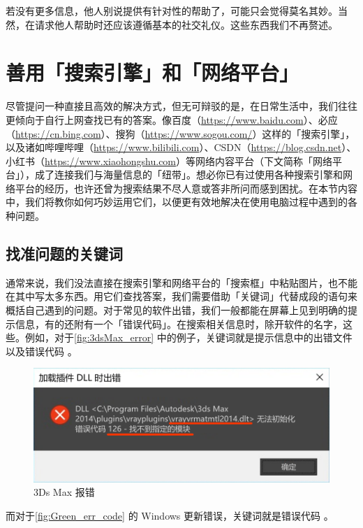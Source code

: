 若没有更多信息，他人别说提供有针对性的帮助了，可能只会觉得莫名其妙。当然，在请求他人帮助时还应该遵循基本的社交礼仪。这些东西我们不再赘述。

\section{善用「搜索引擎」和「网络平台」}

尽管提问一种直接且高效的解决方式，但无可辩驳的是，在日常生活中，我们往往更倾向于自行上网查找已有的答案。像百度（\url{https://www.baidu.com}）、必应（\url{https://cn.bing.com}）、搜狗（\url{https://www.sogou.com/}）这样的「搜索引擎」，以及诸如哔哩哔哩（\url{https://www.bilibili.com}）、CSDN（\url{https://blog.csdn.net}）、小红书（\url{https://www.xiaohongshu.com}）等网络内容平台（下文简称「网络平台」），成了连接我们与海量信息的「纽带」。想必你已有过使用各种搜索引擎和网络平台的经历，也许还曾为搜索结果不尽人意或答非所问而感到困扰。在本节内容中，我们将教你如何巧妙运用它们，以便更有效地解决在使用电脑过程中遇到的各种问题。

\subsection{找准问题的关键词}

通常来说，我们没法直接在搜索引擎和网络平台的「搜索框」中粘贴图片，也不能在其中写太多东西。用它们查找答案，我们需要借助「关键词」代替成段的语句来概括自己遇到的问题。对于常见的软件出错，我们一般都能在屏幕上见到明确的提示信息，有的还附有一个「错误代码」。在搜索相关信息时，除开软件的名字，这些。例如，对于\autoref{fig:3dsMax_error} 中的例子，关键词就是提示信息中的出错文件  以及错误代码 。

\begin{figure}[htb!]
  \centering
  \includegraphics[width=.7\textwidth]{assets/basic/3dsMax_error.png}
  \caption{3Ds Max 报错}
  \label{fig:3dsMax_error}
\end{figure}

而对于\autoref{fig:Green_err_code} 的 Windows 更新错误，关键词就是错误代码 。

